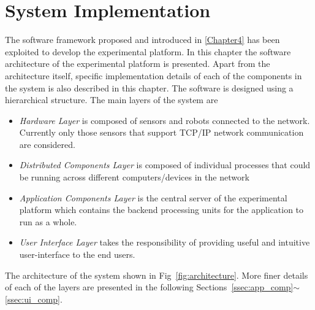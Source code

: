 
\chapter{System Implementation} %

\label{Chapter5} %

The software framework proposed and introduced in \ref{Chapter4} has been exploited to develop the experimental platform. In this chapter the software architecture of the experimental platform is presented. Apart from the architecture itself, specific implementation details of each of the components in the system is also described in this chapter.  The software is designed using a hierarchical structure. The main layers of the system are
\begin{itemize}
\item \emph{Hardware Layer} is composed of sensors and robots connected to the network. Currently only those sensors that support TCP/IP network communication are considered.
\item \emph{Distributed Components Layer} is composed of individual processes that could be running across different computers/devices in the network
\item \emph{Application Components Layer} is the central server of the experimental platform which contains the backend processing units for the application to run as a whole.
\item \emph{User Interface Layer} takes the responsibility of providing useful and intuitive user-interface to the end users.
\end{itemize}
The architecture of the system shown in Fig~\ref{fig:architecture}. More finer details of each of the layers are presented in the following Sections~\ref{ssec:app_comp}$\sim$\ref{ssec:ui_comp}.

